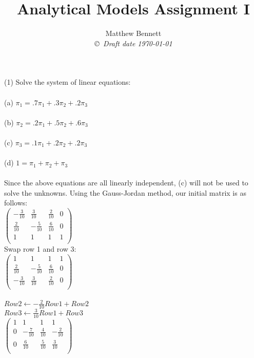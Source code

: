 \documentclass[10pt,fullpage]{article}
\title{ Analytical Models Assignment I }
\author{Matthew Bennett \\
{\small\em \copyright \  Draft date \today }}
\date{ }
\begin{document}
\maketitle

(1) Solve the system of linear equations:\\\\
(a) $\pi_{1} = .7\pi_{1} + .3\pi_{2} + .2\pi_{3}$\\\\
(b) $\pi_{2} = .2\pi_{1} + .5\pi_{2} + .6\pi_{3}$\\\\
(c) $\pi_{3} = .1\pi_{1} + .2\pi_{2} + .2\pi_{3}$\\\\
(d) $1 = \pi_{1} + \pi_{2} + \pi_{3}$\\\\

Since the above equations are all linearly independent, (c) will not be used to solve the unknowns. Using the Gauss-Jordan method, our initial matrix is as follows:\\

$\left(%
\begin{array}{cccc}
  -\frac{3}{10} & \frac{3}{10} & \frac{2}{10} & 0 \\
  \frac{2}{10} & -\frac{5}{10} & \frac{6}{10} & 0 \\
  1 & 1 & 1 & 1 \\
 \end{array}%
\right)$\\

Swap row 1 and row 3:\\
$\left(%
\begin{array}{cccc}
  1 & 1 & 1 & 1 \\
  \frac{2}{10} & -\frac{5}{10} & \frac{6}{10} & 0 \\
  -\frac{3}{10} & \frac{3}{10} & \frac{2}{10} & 0 \\
 \end{array}%
\right)$\\\\



$ Row2 \leftarrow -\frac{2}{10}Row1 + Row2$\\
$ Row3 \leftarrow \frac{3}{10}Row1 + Row3$\\
$\left(%
\begin{array}{cccc}
  1 & 1 & 1 & 1 \\
  0 & -\frac{7}{10} & \frac{4}{10} & -\frac{2}{10} \\
  0 & \frac{6}{10} & \frac{5}{10} & \frac{3}{10} \\
 \end{array}%
\right)$\\
\end{document}
